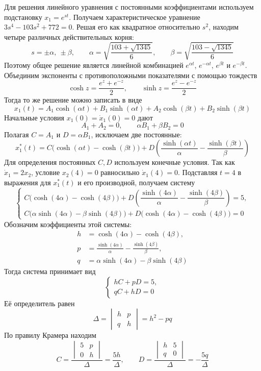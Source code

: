 Для решения линейного уравнения с постоянными коэффициентами
используем подстановку $x_1=e^{st}$. Получаем характеристическое
уравнение $3s^4-103s^2+772=0$. Решая его как квадратное
относительно $s^2$, находим четыре различных действительных корня:
\[
s=\pm\alpha,\ \pm\beta,
\qquad
\alpha=\sqrt{\frac{103+\sqrt{1345}}6},
\qquad
\beta=\sqrt{\frac{103-\sqrt{1345}}6}
\]
Поэтому общее решение является линейной комбинацией
$e^{\alpha t}$, $e^{-\alpha t}$, $e^{\beta t}$ и $e^{-\beta t}$.
Объединим экспоненты с противоположными показателями с помощью
тождеств
\[
\cosh z=\frac{e^z+e^{-z}}2,
\qquad
\sinh z=\frac{e^z-e^{-z}}2
\]
Тогда то же решение можно записать в виде
\[
x_1(t)=A_1\cosh(\alpha t)+B_1\sinh(\alpha t)
+A_2\cosh(\beta t)+B_2\sinh(\beta t)
\]
Начальные условия $x_1(0)=\dot x_1(0)=0$ дают
\[
A_1+A_2=0,
\qquad \alpha B_1+\beta B_2=0
\]
Полагая $C=A_1$ и $D=\alpha B_1$, исключаем две постоянные:
\[
x_1^*(t)=C\bigl(\cosh(\alpha t)-\cosh(\beta t)\bigr)
+D\left(\frac{\sinh(\alpha t)}{\alpha}
-\frac{\sinh(\beta t)}{\beta}\right)
\]
Для определения постоянных $C,D$ используем конечные условия.
Так как $\dot x_1=2x_2$, условие $x_2(4)=0$ равносильно
$\dot x_1(4)=0$. Подставляя $t=4$ в выражения для
$x_1^*(t)$ и его производной, получаем систему
\[
\begin{cases}
C\bigl(\cosh(4\alpha)-\cosh(4\beta)\bigr)
+D\left(\dfrac{\sinh(4\alpha)}{\alpha}
-\dfrac{\sinh(4\beta)}{\beta}\right)=5,\\[6pt]
C\bigl(\alpha\sinh(4\alpha)-\beta\sinh(4\beta)\bigr)
+D\bigl(\cosh(4\alpha)-\cosh(4\beta)\bigr)=0
\end{cases}
\]
Обозначим коэффициенты этой системы:
\[
\begin{aligned}
h&=\cosh(4\alpha)-\cosh(4\beta),\\
p&=\frac{\sinh(4\alpha)}{\alpha}
-\frac{\sinh(4\beta)}{\beta},\\
q&=\alpha\sinh(4\alpha)-\beta\sinh(4\beta)
\end{aligned}
\]
Тогда система принимает вид
\[
\begin{cases}
hC+pD=5,\\
qC+hD=0
\end{cases}
\]
Её определитель равен
\[
\Delta=\begin{vmatrix}h&p\\q&h\end{vmatrix}=h^2-pq
\]
По правилу Крамера находим
\[
C=\frac{\begin{vmatrix}5&p\\0&h\end{vmatrix}}{\Delta}
=\frac{5h}{\Delta},
\qquad
D=\frac{\begin{vmatrix}h&5\\q&0\end{vmatrix}}{\Delta}
=-\frac{5q}{\Delta}
\]
